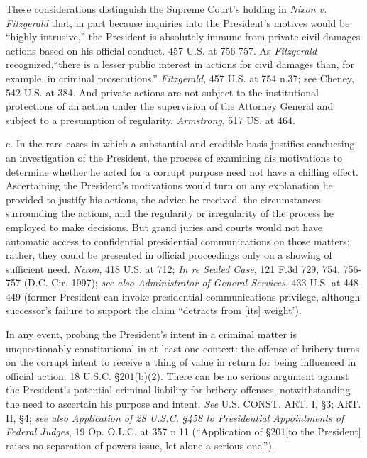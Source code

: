 These considerations distinguish the Supreme Court’s holding in \textit{Nixon v. Fitzgerald} that, in part because inquiries into the President’s motives would be “highly intrusive,” the President is absolutely immune from private civil damages actions based on his official conduct. 457 U.S. at 756-757.
As \textit{Fitzgerald} recognized,“there is a lesser public interest in actions for civil damages than, for example, in criminal prosecutions.”
\textit{Fitzgerald}, 457 U.S. at 754 n.37; see Cheney, 542 U.S. at 384.
And private actions are not subject to the institutional protections of an action under the supervision of the Attorney General and subject to a presumption of regularity.
\textit{Armstrong}, 517 US. at 464.

c. In the rare cases in which a substantial and credible basis justifies conducting an investigation of the President, the process of examining his motivations to determine whether he acted for a corrupt purpose need not have a chilling effect.
Ascertaining the President’s motivations would turn on any explanation he provided to justify his actions, the advice he received, the circumstances surrounding the actions, and the regularity or irregularity of the process he employed to make decisions.
But grand juries and courts would not have automatic access to confidential presidential communications on those matters; rather, they could be presented in official proceedings only on a showing of sufficient need.
\textit{Nixon}, 418 U.S. at 712;
\textit{In re Sealed Case}, 121 F.3d 729, 754, 756-757 (D.C. Cir. 1997);
\textit{see also Administrator of General Services}, 433 U.S. at 448-449 (former President can invoke presidential communications privilege, although successor’s failure to support the claim “detracts from [its] weight’).

In any event, probing the President’s intent in a criminal matter is unquestionably constitutional in at least one context: the offense of bribery turns on the corrupt intent to receive a thing of value in return for being influenced in official action.
18 U.S.C. \S 201(b)(2).
There can be no serious argument against the President’s potential criminal liability for bribery offenses, notwithstanding the need to ascertain his purpose and intent.
\textit{See} U.S. CONST. ART. I, \S 3; ART. II, \S 4;
\textit{see also Application of 28 U.S.C. \S 458 to Presidential Appointments of Federal Judges}, 19 Op. O.L.C. at 357 n.11 (“Application of \S 201[to the President] raises no separation of powers issue, let alone a serious one.”).

